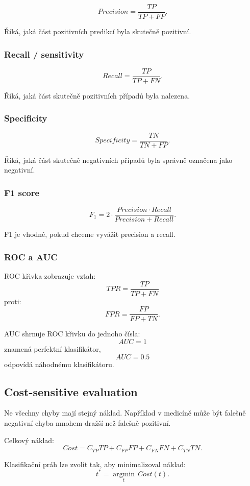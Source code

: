 \[
Precision=
\frac{TP}{TP+FP}.
\]

Říká, jaká část pozitivních predikcí byla skutečně pozitivní.

\subsubsection{Recall / sensitivity}

\[
Recall=
\frac{TP}{TP+FN}.
\]

Říká, jaká část skutečně pozitivních případů byla nalezena.

\subsubsection{Specificity}

\[
Specificity=
\frac{TN}{TN+FP}.
\]

Říká, jaká část skutečně negativních případů byla správně označena jako negativní.

\subsubsection{F1 score}

\[
F_1=
2\cdot
\frac{Precision\cdot Recall}
{Precision+Recall}.
\]

F1 je vhodné, pokud chceme vyvážit precision a recall.

\subsubsection{ROC a AUC}

ROC křivka zobrazuje vztah:
\[
TPR = \frac{TP}{TP+FN}
\]
proti:
\[
FPR = \frac{FP}{FP+TN}.
\]

AUC shrnuje ROC křivku do jednoho čísla:
\[
AUC=1
\]
znamená perfektní klasifikátor,
\[
AUC=0.5
\]
odpovídá náhodnému klasifikátoru.

\subsection{Cost-sensitive evaluation}

Ne všechny chyby mají stejný náklad. Například v medicíně může být falešně negativní chyba mnohem
dražší než falešně pozitivní.

Celkový náklad:
\[
Cost
=
C_{TP}TP+C_{FP}FP+C_{FN}FN+C_{TN}TN.
\]

Klasifikační práh lze zvolit tak, aby minimalizoval náklad:
\[
t^*
=
\underset{t}{\operatorname{argmin}}
\,
Cost(t).
\]

